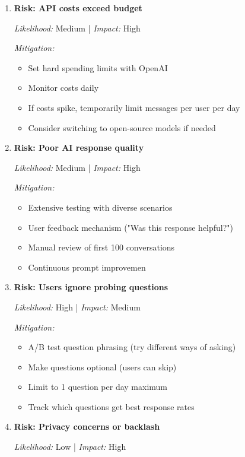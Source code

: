 \documentclass[12pt,a4paper]{article}
\begin{document}
\begin{enumerate}
  \item \textbf{Risk: API costs exceed budget}

  \textit{Likelihood:} Medium | \textit{Impact:} High

  \textit{Mitigation:}
  \begin{itemize}
    \item Set hard spending limits with OpenAI
    \item Monitor costs daily
    \item If costs spike, temporarily limit messages per user per day
    \item Consider switching to open-source models if needed
  \end{itemize}

  \item \textbf{Risk: Poor AI response quality}

  \textit{Likelihood:} Medium | \textit{Impact:} High

  \textit{Mitigation:}
  \begin{itemize}
    \item Extensive testing with diverse scenarios
    \item User feedback mechanism ("Was this response helpful?")
    \item Manual review of first 100 conversations
    \item Continuous prompt improvemen
  \end{itemize}

  \item \textbf{Risk: Users ignore probing questions}

  \textit{Likelihood:} High | \textit{Impact:} Medium

  \textit{Mitigation:}
  \begin{itemize}
    \item A/B test question phrasing (try different ways of asking)
    \item Make questions optional (users can skip)
    \item Limit to 1 question per day maximum
    \item Track which questions get best response rates
  \end{itemize}

  \item \textbf{Risk: Privacy concerns or backlash}

  \textit{Likelihood:} Low | \textit{Impact:} High


\end{enumerate}
\end{document}
